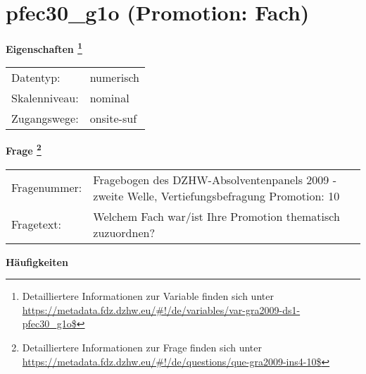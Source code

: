 
    \setcounter{footnote}{0}

    \vspace*{-1.8cm}
	\section{pfec30\_g1o (Promotion: Fach)}
	\label{section:pfec30_g1o}



    \vspace*{0.5cm}
    \noindent\textbf{Eigenschaften
	\footnote{Detailliertere Informationen zur Variable finden sich unter
		\url{https://metadata.fdz.dzhw.eu/\#!/de/variables/var-gra2009-ds1-pfec30_g1o$}}}\\
	\begin{tabularx}{\hsize}{@{}lX}
	Datentyp: & numerisch \\
	Skalenniveau: & nominal \\
	Zugangswege: &
	  onsite-suf
 \\
    \end{tabularx}



				\vspace*{0.5cm}
                \noindent\textbf{Frage
	                \footnote{Detailliertere Informationen zur Frage finden sich unter
		              \url{https://metadata.fdz.dzhw.eu/\#!/de/questions/que-gra2009-ins4-10$}}}\\
				\begin{tabularx}{\hsize}{@{}lX}
					Fragenummer: &
					  Fragebogen des DZHW-Absolventenpanels 2009 - zweite Welle, Vertiefungsbefragung Promotion:
					  10
 \\
					Fragetext: & Welchem Fach war/ist Ihre Promotion thematisch zuzuordnen? \\
				\end{tabularx}





        		\vspace*{0.5cm}
                \noindent\textbf{Häufigkeiten}

